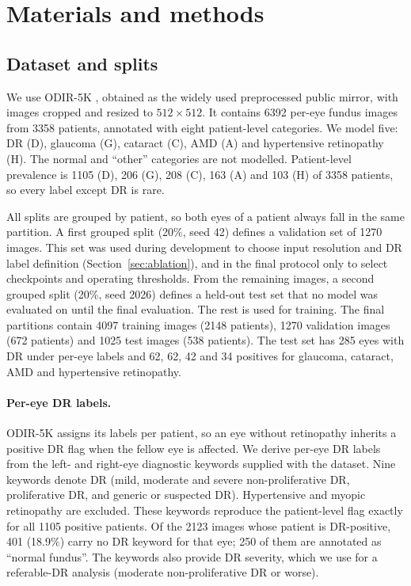 \documentclass[a4paper,fleqn]{cas-sc}
\begin{document}
\section{Materials and methods}
\label{sec:methods}

\subsection{Dataset and splits}
We use ODIR-5K \cite{li2021benchmark,odir2019challenge}, obtained as the
widely used preprocessed public mirror, with images cropped and resized to
$512\times512$. It contains 6392 per-eye fundus images from 3358 patients,
annotated with eight patient-level categories. We model five: DR (D),
glaucoma (G), cataract (C), AMD (A) and hypertensive retinopathy (H). The
normal and ``other'' categories are not modelled. Patient-level prevalence
is 1105 (D), 206 (G), 208 (C), 163 (A) and 103 (H) of 3358 patients, so
every label except DR is rare.

All splits are grouped by patient, so both eyes of a patient always fall
in the same partition. A first grouped split (20\%, seed 42) defines a
validation set of 1270 images. This set was used during development to
choose input resolution and DR label definition (Section~\ref{sec:ablation}),
and in the final protocol only to select checkpoints and operating
thresholds. From the remaining images, a second grouped split (20\%, seed
2026) defines a held-out test set that no model was evaluated on until the
final evaluation. The rest is used for training. The final partitions
contain 4097 training images (2148 patients), 1270 validation images (672
patients) and 1025 test images (538 patients). The test set has 285 eyes
with DR under per-eye labels and 62, 62, 42 and 34 positives for
glaucoma, cataract, AMD and hypertensive retinopathy.

\paragraph{Per-eye DR labels.} ODIR-5K assigns its labels per patient, so
an eye without retinopathy inherits a positive DR flag when the fellow eye
is affected. We derive per-eye DR labels from the left- and right-eye
diagnostic keywords supplied with the dataset. Nine keywords denote DR
(mild, moderate and severe non-proliferative DR, proliferative DR, and
generic or suspected DR). Hypertensive and myopic retinopathy are
excluded. These keywords reproduce the patient-level flag exactly for all
1105 positive patients. Of the 2123 images whose patient is DR-positive,
401 (18.9\%) carry no DR keyword for that eye; 250 of them are annotated as
``normal fundus''. The keywords also provide DR severity, which we use for
a referable-DR analysis (moderate non-proliferative DR or worse).
\end{document}
